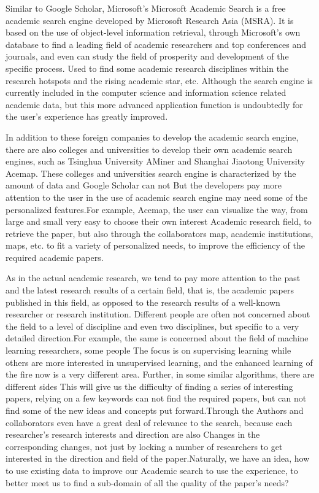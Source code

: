 \begin{bigabstract}
Similar to Google Scholar, Microsoft's Microsoft Academic Search is a free academic search engine developed by Microsoft Research Asia (MSRA). It is based on the use of object-level information retrieval, through Microsoft's own database to find a leading field of academic researchers and top conferences and journals, and even can study the field of prosperity and development of the specific process. Used to find some academic research disciplines within the research hotspots and the rising academic star, etc. Although the search engine is currently included in the computer science and information science related academic data, but this more advanced application function is undoubtedly for the user's experience has greatly improved.

In addition to these foreign companies to develop the academic search engine, there are also colleges and universities to develop their own academic search engines, such as Tsinghua University AMiner and Shanghai Jiaotong University Acemap. These colleges and universities search engine is characterized by the amount of data and Google Scholar can not But the developers pay more attention to the user in the use of academic search engine may need some of the personalized features.For example, Acemap, the user can visualize the way, from large and small very easy to choose their own interest Academic research field, to retrieve the paper, but also through the collaborators map, academic institutions, maps, etc. to fit a variety of personalized needs, to improve the efficiency of the required academic papers.

As in the actual academic research, we tend to pay more attention to the past and the latest research results of a certain field, that is, the academic papers published in this field, as opposed to the research results of a well-known researcher or research institution. Different people are often not concerned about the field to a level of discipline and even two disciplines, but specific to a very detailed direction.For example, the same is concerned about the field of machine learning researchers, some people The focus is on supervising learning while others are more interested in unsupervised learning, and the enhanced learning of the fire now is a very different area. Further, in some similar algorithms, there are different sides This will give us the difficulty of finding a series of interesting papers, relying on a few keywords can not find the required papers, but can not find some of the new ideas and concepts put forward.Through the Authors and collaborators even have a great deal of relevance to the search, because each researcher's research interests and direction are also Changes in the corresponding changes, not just by locking a number of researchers to get interested in the direction and field of the paper.Naturally, we have an idea, how to use existing data to improve our Academic search to use the experience, to better meet us to find a sub-domain of all the quality of the paper's needs?


\end{bigabstract}
